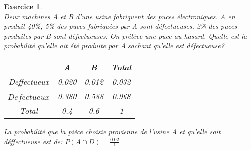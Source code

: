 \documentclass[10pt,a4paper]{article}
\theoremstyle{break}
\newtheorem{exo}{Exercice}
\begin{document}
\begin{center}
   \shadowbox{\begin{large}
      \textcolor{black}{DM de Mathématiques}
   \end{large}}
\end{center}


\begin{exo}\\
	Deux machines A et B d’une usine fabriquent des puces électroniques. A en produit 40\%; 5\% des puces fabriquées par A sont défectueuses, 2\% des puces produites par B sont défectueuses. On prélève une puce au hasard. Quelle est la probabilité qu’elle ait été produite par A sachant qu’elle est défectueuse?

\begin{table}[ht]
        \centering
        \begin{tabular}{|c|c|c|c|}
            \hline
							& A 	& B 	& Total \\
           \hline
         				Deffectueux & \cellcolor{gray} 0.020 & 0.012 & 0.032  \\
           \hline
            $\overline{Defectueux}$ & 0.380 & 0.588 & 0.968  \\
           \hline
            Total & 0.4 & 0.6 & 1  \\
           \hline

        \end{tabular}
    \end{table}

La probabilité que la pièce choisie provienne de l'usine A et qu'elle soit déffectueuse est de: 
$P(A \cap D) = \frac{0.02}{1}$


\end{exo}
\end{document}
